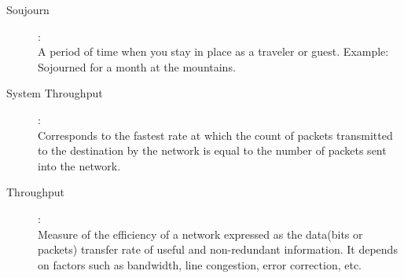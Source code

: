\begin{description}
\item [Soujourn]: \hfill\\ A period of time when you stay in place as a
traveler or guest. Example: Sojourned for a month at the mountains.

\item [System Throughput]:\hfill \\ Corresponds to the fastest rate at which
the count of packets transmitted to the destination by the network is equal to
the number of packets sent into the network.

\item [Throughput]: \hfill\\ Measure of the efficiency of a network expressed
as the data(bits or packets) transfer rate of useful and  non-redundant
information. It depends on factors such as bandwidth, line congestion, error
correction, etc. 

\end{description}
